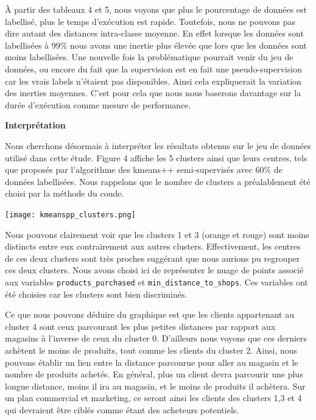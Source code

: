 \documentclass[12pt,a4paper]{book}
\newcommand{\1}{\mathds{1}}
\begin{document}
\vspace{5 mm}
\noindent
À partir des tableaux 4 et 5, nous voyons que plus le pourcentage de données est labellisé, plus le temps d'exécution est rapide. Toutefois, nous ne pouvons pas dire autant des distances intra-classe moyenne. En effet lorsque les données sont labellisées à 99\% nous avons une inertie plus élevée que lors que les données sont moins labellisées. Une nouvelle fois la problématique pourrait venir du jeu de données, ou encore du fait que la supervision est en fait une pseudo-supervision car les vrais labels n'étaient pas disponibles. Ainsi cela expliquerait la variation des inerties moyennes. C'est pour cela que nous nous baserons davantage sur la durée d'exécution comme mesure de performance.
\vspace{20 mm}

\noindent
\textbf{Interprétation}


\vspace{5 mm}
\noindent
Nous cherchons désormais à interpréter les résultats obtenus sur le jeu de données utilisé dans cette étude. Figure 4 affiche les 5 clusters ainsi que leurs centres, tels que proposés par l'algorithme des kmeans++ semi-supervisés avec 60\% de données labellisées. Nous rappelons que le nombre de clusters a préalablement été choisi par la méthode du coude.
\vspace{10 mm}

\begin{center}
\texttt{[image: kmeanspp\_clusters.png]}
\end{center}


\vspace{10 mm}
\noindent
Nous pouvons clairement voir que les clusters 1 et 3 (orange et rouge) sont moins distincts entre eux contrairement aux autres clusters. Effectivement, les centres de ces deux clusters sont très proches suggérant que nous aurions pu regrouper ces deux clusters. Nous avons choisi ici de représenter le nuage de points associé aux variables \verb|products_purchased| et \verb|min_distance_to_shops|. Ces variables ont été choisies car les clusters sont bien discriminés.  

\noindent
Ce que nous pouvons déduire du graphique est que les clients appartenant au cluster 4 sont ceux parcourant les plus petites distances par rapport aux magasins à l'inverse de ceux du cluster 0. D'ailleurs nous voyons que ces derniers achètent le moins de produits, tout comme les clients du cluster 2. Ainsi, nous pouvons établir un lien entre la distance parcourue pour aller au magasin et le nombre de produits achetés. En général, plus un client devra parcourir une plus longue distance, moins il ira au magasin, et le moins de produits il achètera. Sur un plan commercial et marketing, ce seront ainsi les clients des clusters 1,3 et 4 qui devraient être ciblés comme étant des acheteurs potentiels.
\end{document}
